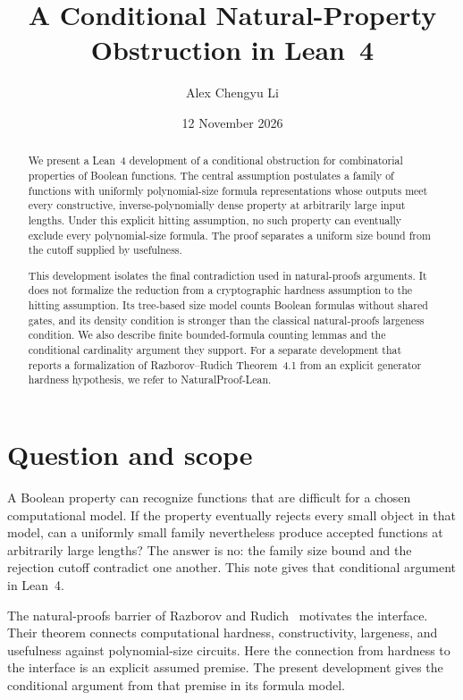 \documentclass[11pt]{amsart}
\title[Conditional Natural-Property Obstruction]%
  {A Conditional Natural-Property Obstruction in Lean~4}
\author{Alex Chengyu Li}
\date{12 November 2026}
\theoremstyle{plain}
\theoremstyle{definition}
\begin{document}
\begin{abstract}
We present a Lean~4 development of a conditional obstruction for
combinatorial properties of Boolean functions. The central assumption
postulates a family of functions with uniformly polynomial-size formula
representations whose outputs meet every constructive, inverse-polynomially
dense property at arbitrarily large input lengths. Under this explicit
hitting assumption, no such property can eventually exclude every
polynomial-size formula. The proof separates a uniform size bound from
the cutoff supplied by usefulness.

This development isolates the final contradiction used in natural-proofs
arguments. It does not formalize the reduction from a cryptographic
hardness assumption to the hitting assumption. Its tree-based size model
counts Boolean formulas without shared gates, and its density condition
is stronger than the classical natural-proofs largeness condition.
We also describe finite bounded-formula counting lemmas and the
conditional cardinality argument they support. For a separate development that reports a
formalization of Razborov--Rudich Theorem~4.1 from an explicit generator
hardness hypothesis, we refer to NaturalProof-Lean.
\end{abstract}
\maketitle

\section{Question and scope}

A Boolean property can recognize functions that are difficult for a
chosen computational model. If the property eventually rejects every
small object in that model, can a uniformly small family nevertheless
produce accepted functions at arbitrarily large lengths? The answer is
no: the family size bound and the rejection cutoff contradict one
another. This note gives that conditional argument in Lean~4.

The natural-proofs barrier of Razborov and Rudich~\cite{RR97} motivates
the interface. Their theorem connects computational hardness,
constructivity, largeness, and usefulness against polynomial-size
circuits. Here the connection from hardness to the interface is an explicit
assumed premise. The present development gives the conditional argument
from that premise in its formula model.
\end{document}

